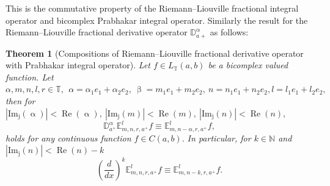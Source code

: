 \documentclass[a4paper,12pt]{article}
\newtheorem{theorem}{Theorem}[section]
\theoremstyle{remark}
\begin{document}
\noindent This is the commutative property of  the Riemann–Liouville fractional integral operator and  bicomplex Prabhakar integral operator.
Similarly  the result for the Riemann–Liouville fractional derivative operator $\mathbb{D}^{\alpha}_{a+}$ as  \cite{kilbas2004generalized} follows:
\begin{theorem}[Compositions of Riemann–Liouville fractional derivative operator with Prabhakar
integral operator]
	Let $f\in  L_{\mathbb{T}}(a, b)$ be a bicomplex valued function. Let $\alpha,m,n,l,r\in \mathbb{T},~ ~\alpha= \alpha_1e_1+\alpha_2e_2,  ~ \upbeta=m_1e_1+m_2e_2,~ n=n_1e_1+n_2e_2,l=l_1e_1+l_2e_2,$ then for $|\operatorname{Im_j}(\upalpha)|<\operatorname{Re}(\upalpha),~|\operatorname{Im_j}(m )|<\operatorname{Re}(m),~|\operatorname{Im_j}(n) |<\operatorname{Re}(n),$
	\begin{equation}
\mathbb{D}^{\alpha}_{a^+}\mathbb{E}^{l}_{m,n,r,a^+}f\equiv\mathbb{E}^{l}_{m,n-\alpha ,r,a^+}f,
\end{equation}
holds for any continuous function $f\in  C(a, b).$ In particular, for $k\in \mathbb{N}$ and  $|\operatorname{Im_j}(n)|<\operatorname{Re}(n)-k$
\begin{equation}
\left( \frac{d}{dx}\right)^k \mathbb{E}^{l}_{m,n,r,a^+}f\equiv\mathbb{E}^{l}_{m,n-k,r,a^+}f.
\end{equation}\end{theorem}
\end{document}

